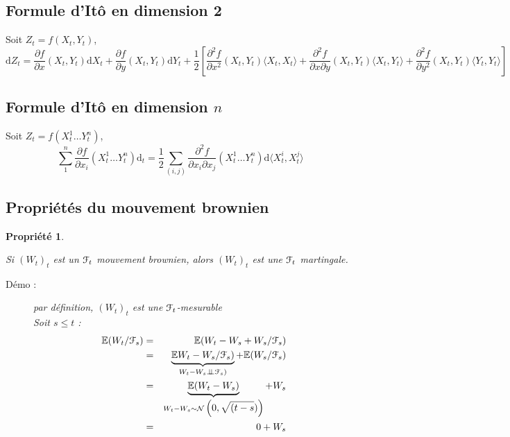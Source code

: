 \documentclass{report}
\newcommand{\indep}{\perp \!\!\! \perp}
\newtheorem{prop}{Propri\'et\'e}
\newenvironment{encadre}{%
  \setlength{\theorempreskipamount}{0pt}%
  \setlength{\theorempostskipamount}{0pt}%
  \begin{framed}%
 }{%
  \vspace{-2pt}%
  \end{framed}%
 }
\begin{document}
\subsection{Formule d'Itô en dimension 2}
Soit $Z_t = f(X_t, Y_t)$, \[\mathrm{d}Z_t=\displaystyle\frac{\partial f}{\partial x}(X_t,Y_t)\mathrm{d}X_t+\displaystyle\frac{\partial f}{\partial y}(X_t,Y_t)\mathrm{d}Y_t+\displaystyle\frac{1}{2}\left[\displaystyle\frac{\partial^2 f}{\partial x^2}(X_t,Y_t)\langle X_t,X_t\rangle+\displaystyle\frac{\partial^2 f}{\partial x\partial y}(X_t,Y_t)\langle X_t,Y_t\rangle+\displaystyle\frac{\partial^2 f}{\partial y^2}(X_t,Y_t)\langle Y_t,Y_t\rangle\right]\]

\subsection{Formule d'Itô en dimension $n$}
Soit $Z_t = f(X^1_t\dots Y^n_t)$, \[\displaystyle\sum^n_1\displaystyle\frac{\partial f}{\partial x_i}(X^1_t\dots Y^n_t) \mathrm{d}_t=\displaystyle\frac{1}{2}\sum_{(i,j)}\displaystyle\frac{\partial^2f}{\partial x_i\partial x_j}(X^1_t\dots Y^n_t)\mathrm{d}\langle X^i_t, X^j_t\rangle \]


\subsection{Propriétés du mouvement brownien}

\begin{encadre}
\begin{prop}$\ $

Si $(W_t)_t$ est un $\EuScript{F}_t$ mouvement brownien, alors $(W_t)_t$ est une $\EuScript{F}_t$ martingale.
\begin{description}
    \item [Démo : ] par définition, $(W_t)_t$ est une $\EuScript{F}_t$-mesurable\\
    Soit $s\leq t$ : 
    \begin{eqnarray}
    \mathbb{E}(W_t/\EuScript{F}_s)&=&\mathbb{E}(W_t-W_s+W_s/\EuScript{F}_s) \nonumber \\
    &=& \underbrace{\mathbb{E}W_t-W_s/\EuScript{F}_s)}_{W_t-W_s\indep\EuScript{F}_s)}+\mathbb{E}(W_s/\EuScript{F}_s)\nonumber \\
    &=&\underbrace{\mathbb{E}(W_t-W_s)}_{W_t-W_s\sim\mathcal{N}\displaystyle\left(0,\sqrt{(t-s})\right)}+W_s\nonumber\\
    &=&0+W_s\nonumber
    \end{eqnarray}
\end{description}
\end{prop}
\end{encadre}
\end{document}

